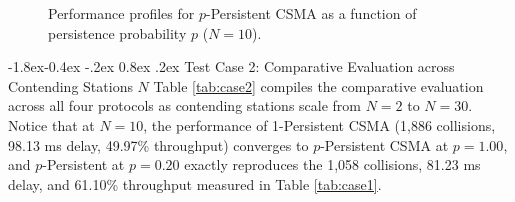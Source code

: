 \documentclass[11pt,a4paper]{article}
\makeatletter
\renewcommand\subsection{\@startsection{subsection}{2}{\z@}%
                                     {-1.8ex\@plus -0.4ex \@minus -.2ex}%
                                     {0.8ex \@plus .2ex}%
                                     {\normalfont\large\bfseries}}
\makeatother
\begin{document}
\begin{figure}[H]
{
    }
    \caption{Performance profiles for $p$-Persistent CSMA as a function of persistence probability $p$ ($N=10$).}
    \label{fig:case1_plots}
\end{figure}

\subsection{Test Case 2: Comparative Evaluation across Contending Stations \texorpdfstring{$N$}{N}}
Table \ref{tab:case2} compiles the comparative evaluation across all four protocols as contending stations scale from $N = 2$ to $N = 30$. Notice that at $N = 10$, the performance of 1-Persistent CSMA (1,886 collisions, 98.13 ms delay, 49.97\% throughput) converges to $p$-Persistent CSMA at $p = 1.00$, and $p$-Persistent at $p = 0.20$ exactly reproduces the 1,058 collisions, 81.23 ms delay, and 61.10\% throughput measured in Table \ref{tab:case1}.
\end{document}
